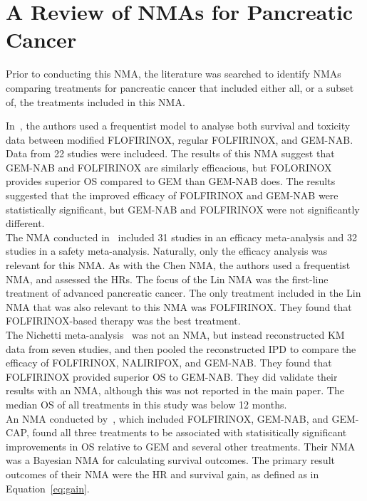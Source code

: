 \chapter{A Review of NMAs for Pancreatic Cancer}

Prior to conducting this NMA, the literature was searched to identify NMAs comparing treatments for pancreatic cancer that included either all, or a subset of, the treatments included in this NMA. 

In~\cite{chen}, the authors used a frequentist model to analyse both survival and toxicity data between modified FLOFIRINOX, regular FOLFIRINOX, and GEM-NAB. Data from 22 studies were includeed. The results of this NMA suggest that GEM-NAB and FOLFIRINOX are similarly efficacious, but FOLORINOX provides superior OS compared to GEM than GEM-NAB does. The results suggested that the improved efficacy of FOLFIRINOX and GEM-NAB were statistically significant, but GEM-NAB and FOLFIRINOX were not significantly different. \\

The NMA conducted in~\cite{lin} included 31 studies in an efficacy meta-analysis and 32 studies in a safety meta-analysis. Naturally, only the efficacy analysis was relevant for this NMA. As with the Chen NMA, the authors used a frequentist NMA, and assessed the HRs. The focus of the Lin NMA was the first-line treatment of advanced pancreatic cancer. The only treatment included in the Lin NMA that was also relevant to this NMA was FOLFIRINOX. They found that FOLFIRINOX-based therapy was the best treatment. \\

The Nichetti meta-analysis~\cite{nichetti} was not an NMA, but instead reconstructed KM data from seven studies, and then pooled the reconstructed IPD to compare the efficacy of FOLFIRINOX, NALIRIFOX, and GEM-NAB. They found that FOLFIRINOX provided superior OS to GEM-NAB. They did validate their results with an NMA, although this was not reported in the main paper. The median OS of all treatments in this study was below 12 months. \\

An NMA conducted by~\cite{gresham2014}, which included FOLFIRINOX, GEM-NAB, and GEM-CAP, found all three treatments to be associated with statisitically significant improvements in OS relative to GEM and several other treatments. Their NMA was a Bayesian NMA for calculating survival outcomes. The primary result outcomes of their NMA were the HR and survival gain, as defined as in Equation~\ref{eq:gain}. 

